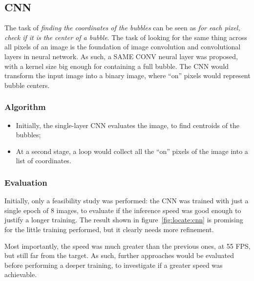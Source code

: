 \subsection{CNN}

The task of \textit{finding the coordinates of the bubbles} can be seen as \textit{for each pixel, check if it is the center of a bubble}.
The task of looking for the same thing across all pixels of an image is the foundation of image convolution and convolutional layers in neural network.
As such, a SAME CONV neural layer was proposed, with a kernel size big enough for containing a full bubble.
The CNN would transform the input image into a binary image, where ``on'' pixels would represent bubble centers.

\subsubsection{Algorithm}

\begin{itemize}
	\itemsep 0em
	\item Initially, the single-layer CNN evaluates the image, to find centroids of the bubbles;
	\item At a second stage, a loop would collect all the ``on'' pixels of the image into a list of coordinates.
\end{itemize}

\subsubsection{Evaluation}

Initially, only a feasibility study was performed: the CNN was trained with just a single epoch of 8 images, to evaluate if the inference speed was good enough to justify a longer training.
The result shown in figure~\ref{fig:locate:cnn} is promising for the little training performed, but it clearly needs more refinement.

Most importantly, the speed was much greater than the previous ones, at 55 FPS, but still far from the target.
As such, further approaches would be evaluated before performing a deeper training, to investigate if a greater speed was achievable.

